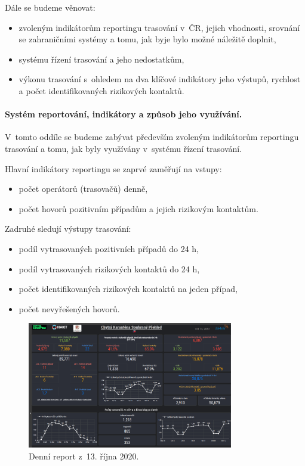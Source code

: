 \newpage

Dále se budeme věnovat:
\begin{itemize}
\item zvoleným indikátorům reportingu trasování v~ČR, jejich vhodnosti, srovnání se zahraničními systémy a tomu, jak byje  bylo možné náležitě doplnit,
\item systému řízení trasování a jeho nedostatkům,
\item výkonu trasování s~ohledem na dva klíčové indikátory jeho výstupů, rychlost a počet identifikovaných rizikových kontaktů.
\end{itemize}


\paragraph{Systém reportování, indikátory a způsob jeho využívání.} V~tomto oddíle se budeme zabývat především zvoleným indikátorům reportingu trasování a tomu, jak byly využívány v~systému řízení trasování.

Hlavní indikátory reportingu se zaprvé zaměřují na vstupy:
\begin{itemize}
\item počet operátorů (trasovačů) denně,
\item počet hovorů pozitivním případům a jejich rizikovým kontaktům.
\end{itemize}

Zadruhé sledují výstupy trasování:
\begin{itemize}
\item podíl vytrasovaných pozitivních případů do 24 h,
\item podíl vytrasovaných rizikových kontaktů do 24 h,
\item počet identifikovaných rizikových kontaktů na jeden případ,
\item počet nevyřešených hovorů.
\end{itemize}

\begin{figure}[ht]
    \centering
    \includegraphics[width=0.8\textwidth]{./pic/daktela.jpg}
    \caption{Denní report z~13. října 2020.}
    \label{fig:daktela}
\end{figure}



